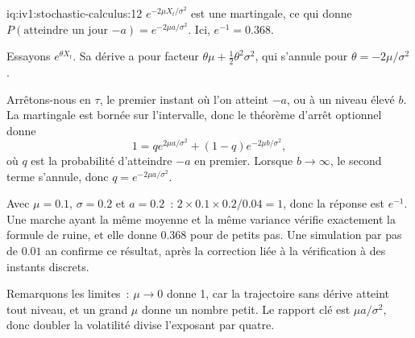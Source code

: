 \begin{solution}{iq:iv1:stochastic-calculus:12}
$e^{-2\mu X_t/\sigma^2}$ est une martingale, ce qui donne $P(\text{atteindre un jour } {-a}) = e^{-2\mu a/\sigma^2}$. Ici, $e^{-1} = 0.368$.

Essayons $e^{\theta X_t}$. Sa dérive a pour facteur $\theta\mu + \frac12\theta^2\sigma^2$, qui s'annule pour $\theta = -2\mu/\sigma^2$.

Arrêtons-nous en $\tau$, le premier instant où l'on atteint $-a$, ou à un niveau élevé $b$. La martingale est bornée sur l'intervalle, donc le théorème d'arrêt optionnel donne
\[
1 = qe^{2\mu a/\sigma^2} + (1 - q)e^{-2\mu b/\sigma^2},
\]
où $q$ est la probabilité d'atteindre $-a$ en premier. Lorsque $b \to \infty$, le second terme s'annule, donc $q = e^{-2\mu a/\sigma^2}$.

Avec $\mu = 0.1$, $\sigma = 0.2$ et $a = 0.2$~: $2 \times 0.1 \times 0.2/0.04 = 1$, donc la réponse est $e^{-1}$. Une marche ayant la même moyenne et la même variance vérifie exactement la formule de ruine, et elle donne $0.368$ pour de petits pas. Une simulation par pas de $0.01$ an confirme ce résultat, après la correction liée à la vérification à des instants discrets.

Remarquons les limites~: $\mu \to 0$ donne 1, car la trajectoire sans dérive atteint tout niveau, et un grand $\mu$ donne un nombre petit. Le rapport clé est $\mu a/\sigma^2$, donc doubler la volatilité divise l'exposant par quatre.



\end{solution}

